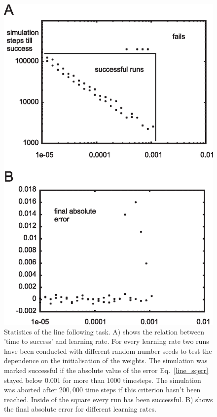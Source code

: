 \documentclass{aamas2018}
\begin{document}
\begin{figure}[!ht]
  \centering
  \includegraphics[width=0.9\columnwidth]{line_stats}
  \caption{Statistics of the line following task. A) shows the relation between
    'time to success' and learning rate. For every learning rate two runs have
    been conducted with different random number seeds to test the dependence on the
    initialisation of the weights. The simulation was marked successful if the
    absolute value of the error Eq.~\ref{line_sqerr} stayed below $0.001$ for more than $1000$
    timesteps. The simulation was aborted after $200,000$ time steps if this criterion
    hasn't been reached. Inside of the square every run has been successful.
    B) shows the final absolute error for different learning rates.
    \label{line_stats}}
\end{figure}
\end{document}
